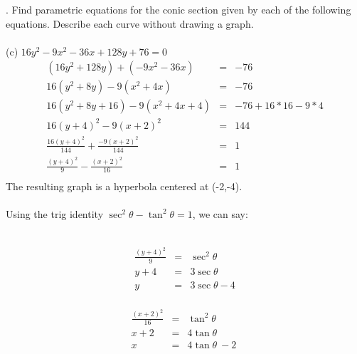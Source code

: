 \documentclass[11pt]{exam}
\begin{document}
. Find parametric equations for the conic section given by each of the following equations. Describe each curve without drawing a graph. \\
\\
\indent (c) $16y^2-9x^2-36x+128y+76=0$\\
\begin{eqnarray*}
(16y^2+128y)+(-9x^2-36x)&=&-76\\
16(y^2+8y)-9(x^2+4x)&=&-76\\
16(y^2+8y+16)-9(x^2+4x+4)&=&-76+16*16-9*4\\
16(y+4)^2-9(x+2)^2&=&144\\
\frac{16(y+4)^2}{144}+\frac{-9(x+2)^2}{144}&=&1\\
\frac{(y+4)^2}{9}-\frac{(x+2)^2}{16}&=&1\\
\end{eqnarray*}
The resulting graph is a hyperbola centered at (-2,-4).\\
\\
Using the trig identity $\sec^2 \theta - \tan^2 \theta = 1$, we can say:\\
\\
\noindent\begin{minipage}{.5\linewidth}
\begin{eqnarray*}
  \frac{(y+4)^2}{9}&=&\sec^2 \theta\\
  y+4&=&3\sec \theta\\
  y&=&3\sec \theta -4\\
\end{eqnarray*}
\end{minipage}%
\begin{minipage}{.5\linewidth}
\begin{eqnarray*}
  \frac{(x+2)^2}{16}&=&\tan^2 \theta\\
  x+2&=&4\tan \theta\\
  x&=&4\tan \theta\ -2\
\end{eqnarray*}
\end{minipage}
\end{document}
